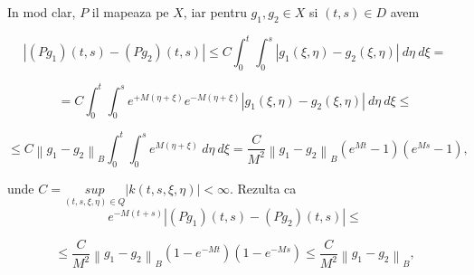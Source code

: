 \documentclass[a4paper,12pt,oneside]{report}
\begin{document}
\begin{enumerate}
		      	In mod clar, \(P\) il mapeaza pe \(X\), iar pentru \(g_{1}, g_{2} \in X\) si \(\left ( t,s \right )  \in D\) avem 
		      			      			      			      			      	
		      	\begin{displaymath}
		      		\left | \left ( Pg_{1} \right )\left ( t,s \right ) - \left ( Pg_{2} \right )\left ( t,s \right ) \right | \leq  C\int_{0}^{t}\int_{0}^{s} \left | g_{1}\left ( \xi ,\eta  \right ) - g_{2}\left ( \xi ,\eta  \right ) \right | \ d\eta  \ d\xi  =
		      	\end{displaymath}
		      			      			      			      			      	
		      	\begin{displaymath}
		      		= C\int_{0}^{t}\int_{0}^{s} e^{+M\left ( \eta +\xi  \right )}e^{-M\left ( \eta +\xi  \right )}\left | g_{1}\left ( \xi ,\eta  \right ) - g_{2} \left ( \xi ,\eta  \right )\right | \ d\eta  \ d\xi \leq
		      	\end{displaymath}
		      			      			      			      	
		      	\begin{displaymath}
		      		\leq C\left \| g_{1} - g_{2} \right \|_{B} \int_{0}^{t}\int_{0}^{s} e^{M\left ( \eta +\xi  \right )} \ d\eta  \ d\xi   = \frac{C}{M^{2}}\left \| g_{1} - g_{2} \right \|_{B}\left ( e^{Mt}  - 1\right )\left ( e^{Ms} - 1 \right ), 
		      	\end{displaymath}
		      			      			      			      	
		      			      			      			      			      	
		      			      			      			      			      	
		      	unde \(C = \underset{ \left ( t,s,\xi ,\eta  \right ) \in Q}{ sup}\left | k\left ( t,s,\xi ,\eta  \right ) \right | < \infty\). Rezulta ca 
		      	\begin{displaymath}
		      		e^{-M\left ( t+s \right )} \left | \left ( Pg_{1} \right ) \left ( t,s \right ) - \left ( Pg_{2} \right )\left ( t,s \right )\right | \leq
		      	\end{displaymath}
		      			      			      			      			      	
		      	\begin{displaymath}
		      		\leq \frac{C}{M^{2}}\left \| g_{1} - g_{2} \right \|_{B}\left ( 1 - e ^{-Mt} \right )\left ( 1 - e^{-Ms} \right )\leq \frac{C}{M^{2}}\left \| g_{1} - g_{2}\right \|_{B}, 
		      	\end{displaymath}
		      			      			      			      	

\end{enumerate}
\end{document}
